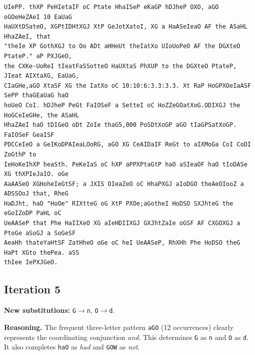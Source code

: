 \documentclass[11pt,a4paper]{article}
\begin{document}
\begin{lstlisting}[style=ciphertext,caption={Complete text after iteration 4}]
UIePP. thXP PeHIetaIF oC Ptate HhaISeP eKaGP hDJheP OXO, aGO oGOeHeZAeI 10 EaUaG
HaUXtDSateO, XGPtIDHtXGJ XtP GeJotXatoI, XG a HaASeIeaO AF the ASaHL HhaZAeI, that
"theIe XP GothXGJ to Oo ADt aHHeUt theIatXo UIoUoPeO AF the DGXteO PtateP." aP PXJGeO,
the CXKe-UoReI tIeatFaSSotteO HaUXtaS PhXUP to the DGXteO PtateP, JIeat AIXtaXG, EaUaG,
CIaGHe,aGO XtaSF XG the IatXo oC 10:10:6:3.3:3.3. Xt RaP HoGPXOeIaASF SePP thaGEaUaG haO
hoUeO CoI. hDJheP PeGt FaIOSeF a SetteI oC HoZZeGOatXoG.ODIXGJ the HoGCeIeGHe, the ASaHL
HhaZAeI haO tDIGeO oDt ZoIe thaG5,000 PoSDtXoGP aGO tIaGPSatXoGP. FaIOSeF GeaISF
PDCCeIeO a GeIKoDPAIeaLOoRG, aGO XG CeAIDaIF ReGt to aIXMoGa CoI CoDI ZoGthP to
IeHoKeIhXP heaSth. PeKeIaS oC hXP aPPXPtaGtP haO aSIeaOF haO tIoDASe XG thXPIeJaIO. oGe
AaAASeO XGHoheIeGtSF; a JXIS OIeaZeO oC HhaPXGJ aIoDGO theAeOIooZ a ADSSOoJ that, RheG
HaDJht, haO "HoOe" RIXtteG oG XtP PXOe;aGotheI HoDSO SXJhteG the eGoIZoDP PaHL oC
UeAASeP that Phe HaIIXeO XG aIeHDIIXGJ GXJhtZaIe oGSF AF CXGOXGJ a PtoGe aSoGJ a SoGeSF
AeaHh thateYaHtSF ZatHheO oGe oC heI UeAASeP, RhXHh Phe HoDSO theG HaPt XGto thePea. aSS
thIee IePXJGeO.
\end{lstlisting}

\newpage
\subsection{Iteration 5}

\noindent\textbf{New substitutions:} \texttt{G}$\rightarrow$\texttt{n}, \texttt{O}$\rightarrow$\texttt{d}.\par
\smallskip
\noindent\textbf{Reasoning.} The frequent three-letter pattern \texttt{aGO} (12 occurrences) clearly represents the coordinating conjunction \textit{and}. This determines \texttt{G} as \texttt{n} and \texttt{O} as \texttt{d}. It also completes \texttt{haO} as \textit{had} and \texttt{GOW} as \textit{not}.
\end{document}
